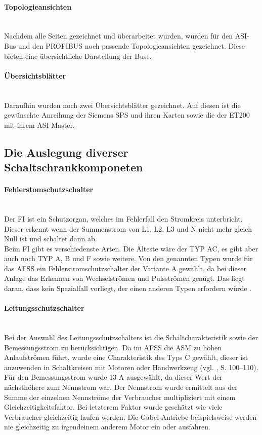     \paragraph{Topologieansichten}\mbox{}\\
    Nachdem alle Seiten gezeichnet und überarbeitet wurden, wurden für den ASI-Bus und den PROFIBUS noch passende Topologieansichten gezeichnet. Diese bieten eine übersichtliche Darstellung der Buse.
    \paragraph{Übersichtsblätter}\mbox{}\\
    Daraufhin wurden noch zwei Übersichtsblätter gezeichnet. Auf diesen ist die gewünschte Anreihung der Siemens SPS und ihren Karten sowie die der ET200 mit ihrem ASI-Master.
\subsection{Die Auslegung diverser Schaltschrankkomponeten}
    \paragraph{Fehlerstomschutzschalter}\mbox{}\\
    Der FI ist ein Schutzorgan, welches im Fehlerfall den Stromkreis unterbricht. Dieser erkennt wenn der Summenstrom von L1, L2, L3 und N nicht mehr gleich Null ist und schaltet dann ab.\\
    Beim FI gibt es verschiedenste Arten. Die Älteste wäre der TYP AC, es gibt aber auch noch TYP A, B und F sowie weitere. Von den genannten Typen wurde für das AFSS ein Fehlerstromschutzschalter der Variante A gewählt, da bei dieser Anlage das Erkennen von Wechselströmen und Pulsströmen genügt. Das liegt daran, dass kein Spezialfall vorliegt, der einen anderen Typen erfordern würde \cite{FI-Typen}.
    \paragraph{Leitungsschutzschalter}\mbox{}\\
    Bei der Auswahl des Leitungsschutzschalters ist die Schaltcharakteristik sowie der Bemessungsstrom zu berücksichtigen. Da im AFSS die ASM zu hohen Anlaufströmen führt, wurde eine Charakteristik des Typs C gewählt, dieser ist anzuwenden in Schaltkreisen mit Motoren oder Handwerkzeug (vgl. \cite{SeyrRösch}, S. 100–110). Für den Bemessungsstrom wurde 13 A ausgewählt, da dieser Wert der nächsthöhere zum Nennstrom war. Der Nennstrom wurde ermittelt aus der Summe der einzelnen Nennströme der Verbraucher multipliziert mit einem Gleichzeitigkeitsfaktor. Bei letzterem Faktor wurde geschätzt wie viele Verbraucher gleichzeitig laufen werden. Die Gabel-Antriebe beispielsweise werden nie gleichzeitig zu irgendeinem anderem Motor ein oder ausfahren. 
